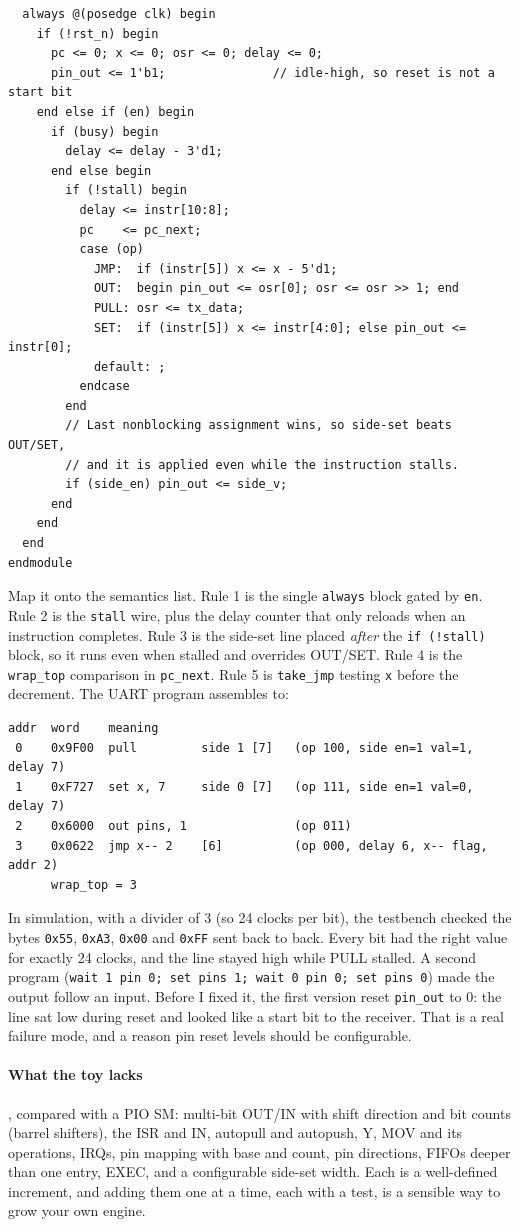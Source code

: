 {\begin{verbatim}
  always @(posedge clk) begin
    if (!rst_n) begin
      pc <= 0; x <= 0; osr <= 0; delay <= 0;
      pin_out <= 1'b1;               // idle-high, so reset is not a start bit
    end else if (en) begin
      if (busy) begin
        delay <= delay - 3'd1;
      end else begin
        if (!stall) begin
          delay <= instr[10:8];
          pc    <= pc_next;
          case (op)
            JMP:  if (instr[5]) x <= x - 5'd1;
            OUT:  begin pin_out <= osr[0]; osr <= osr >> 1; end
            PULL: osr <= tx_data;
            SET:  if (instr[5]) x <= instr[4:0]; else pin_out <= instr[0];
            default: ;
          endcase
        end
        // Last nonblocking assignment wins, so side-set beats OUT/SET,
        // and it is applied even while the instruction stalls.
        if (side_en) pin_out <= side_v;
      end
    end
  end
endmodule
\end{verbatim}
}
Map it onto the semantics list. Rule 1 is the single \texttt{always} block
gated by \texttt{en}. Rule 2 is the \texttt{stall} wire, plus the delay
counter that only reloads when an instruction completes. Rule 3 is the
side-set line placed \emph{after} the \texttt{if (!stall)} block, so it runs
even when stalled and overrides OUT/SET. Rule 4 is the \texttt{wrap\_top}
comparison in \texttt{pc\_next}. Rule 5 is \texttt{take\_jmp} testing
\texttt{x} before the decrement. The UART program assembles to:
\begin{verbatim}
addr  word    meaning
 0    0x9F00  pull         side 1 [7]   (op 100, side en=1 val=1, delay 7)
 1    0xF727  set x, 7     side 0 [7]   (op 111, side en=1 val=0, delay 7)
 2    0x6000  out pins, 1               (op 011)
 3    0x0622  jmp x-- 2    [6]          (op 000, delay 6, x-- flag, addr 2)
      wrap_top = 3
\end{verbatim}
In simulation, with a divider of 3 (so 24 clocks per bit), the testbench
checked the bytes \texttt{0x55}, \texttt{0xA3}, \texttt{0x00} and
\texttt{0xFF} sent back to back. Every bit had the right value for exactly
24 clocks, and the line stayed high while PULL stalled. A second program
(\texttt{wait 1 pin 0; set pins 1; wait 0 pin 0; set pins 0}) made the
output follow an input. Before I fixed it, the first version reset
\texttt{pin\_out} to 0: the line sat low during reset and looked like a start
bit to the receiver. That is a real failure mode, and a reason pin reset
levels should be configurable.

\paragraph{What the toy lacks}, compared with a PIO SM: multi-bit OUT/IN with
shift direction and bit counts (barrel shifters), the ISR and IN, autopull
and autopush, Y, MOV and its operations, IRQs, pin mapping with base and
count, pin directions, FIFOs deeper than one entry, EXEC, and a
configurable side-set width. Each is a well-defined increment, and adding
them one at a time, each with a test, is a sensible way to grow your own
engine.


